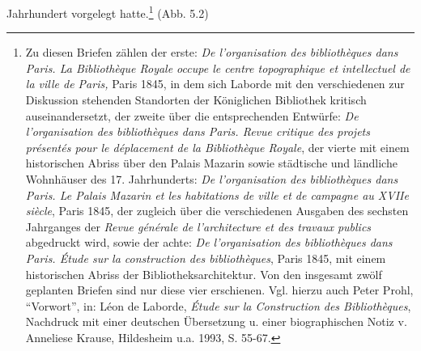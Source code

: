 Jahrhundert vorgelegt hatte.\footnote{Zu diesen Briefen zählen der
  erste: \emph{De l'organisation des bibliothèques dans Paris. La
  Bibliothèque Royale occupe le centre topographique et intellectuel de
  la ville de Paris,} Paris 1845, in dem sich Laborde mit den
  verschiedenen zur Diskussion stehenden Standorten der Königlichen
  Bibliothek kritisch auseinandersetzt, der zweite über die
  entsprechenden Entwürfe: \emph{De l'organisation des bibliothèques
  dans Paris. Revue critique des projets présentés pour le déplacement
  de la Bibliothèque Royale}, der vierte mit einem historischen Abriss
  über den Palais Mazarin sowie städtische und ländliche Wohnhäuser des
  17. Jahrhunderts: \emph{De l'organisation des bibliothèques dans
  Paris. Le Palais Mazarin et les habitations de ville et de campagne au
  XVIIe siècle}, Paris 1845, der zugleich über die verschiedenen
  Ausgaben des sechsten Jahrganges der \emph{Revue générale de
  l'architecture et des travaux publics} abgedruckt wird, sowie der
  achte: \emph{De l'organisation des bibliothèques dans Paris. Étude sur
  la construction des bibliothèques}, Paris 1845, mit einem historischen
  Abriss der Bibliotheksarchitektur. Von den insgesamt zwölf geplanten
  Briefen sind nur diese vier erschienen. Vgl. hierzu auch Peter Prohl,
  \enquote{Vorwort}, in: Léon de Laborde, \emph{Étude sur la
  Construction des Bibliothèques}, Nachdruck mit einer deutschen
  Übersetzung u. einer biographischen Notiz v. Anneliese Krause,
  Hildesheim u.a. 1993, S. 55-67.} (Abb. 5.2)

